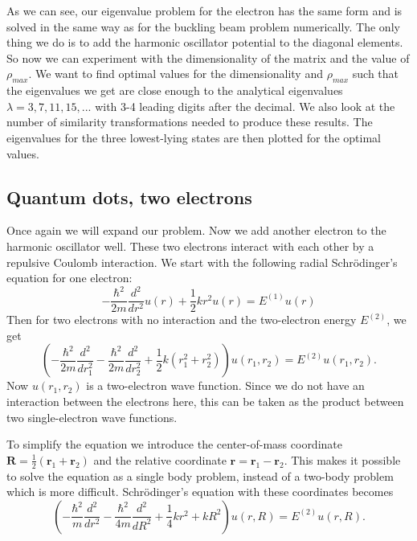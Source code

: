 \documentclass[12pt,a4paper,english]{article}
\begin{document}
As we can see, our eigenvalue problem for the electron has the same form and is solved in the same way as for the buckling beam problem numerically. The only thing we do is to add the harmonic oscillator potential to the diagonal elements. So now we can experiment with the dimensionality of the matrix and the value of $\rho_{max}$. We want to find optimal values for the dimensionality and $\rho_{max}$ such that the eigenvalues we get are close enough to the analytical eigenvalues $\lambda=3,7,11,15,...$ with 3-4 leading digits after the decimal. We also look at the number of similarity transformations needed to produce these results. The eigenvalues for the three lowest-lying states are then plotted for the optimal values.

\subsection{Quantum dots, two electrons}
\label{sect:quantum_two}
Once again we will expand our problem. Now we add another electron to the harmonic oscillator well. These two electrons interact with each other by a repulsive Coulomb interaction. We start with the following radial Schrödinger's equation for one electron:
\begin{equation}
\label{eq:schr_single_2}
-\frac{\hbar^2}{2m}\frac{d^2}{dr^2}u(r)+\frac{1}{2}kr^2u(r)=E^{(1)}u(r)
\end{equation}
Then for two electrons with no interaction and the two-electron energy $E^{(2)}$, we get
\begin{equation}
\label{eq:schr_double_2}
\left(-\frac{\hbar^2}{2m}\frac{d^2}{dr_1^2}-\frac{\hbar^2}{2m}\frac{d^2}{dr_2^2}+\frac{1}{2}k(r_1^2+r_2^2)\right)u(r_1,r_2)=E^{(2)}u(r_1,r_2).
\end{equation}
Now $u(r_1,r_2)$ is a two-electron wave function. Since we do not have an interaction between the electrons here, this can be taken as the product between two single-electron wave functions.

To simplify the equation we introduce the center-of-mass coordinate $\textbf{R}=\frac{1}{2}(\textbf{r}_1+\textbf{r}_2)$ and the relative coordinate $\textbf{r}=\textbf{r}_1-\textbf{r}_2$. This makes it possible to solve the equation as a single body problem, instead of a two-body problem which is more difficult. Schrödinger's equation with these coordinates becomes
\begin{equation}
\label{eq:schr_CM}
\left(-\frac{\hbar^2}{m}\frac{d^2}{dr^2}-\frac{\hbar^2}{4m}\frac{d^2}{dR^2}+\frac{1}{4}kr^2+kR^2\right)u(r,R)=E^{(2)}u(r,R).
\end{equation}
\end{document}
